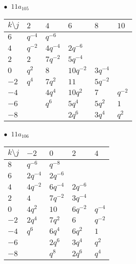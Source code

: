 \begin{minipage}{\linewidth}
$\bullet\ $ $11a_{105}$ \vspace{0.5em} \\
\begin{tabular}{l|lllll}
$k \setminus j$ & $2$ & $4$ & $6$ & $8$ & $10$ \\
\hline
$6$ & $q^{-4}$ & $q^{-6}$ &  &  &  \\
$4$ & $q^{-2}$ & $4q^{-4}$ & $2q^{-6}$ &  &  \\
$2$ & $2$ & $7q^{-2}$ & $5q^{-4}$ &  &  \\
$0$ & $q^{2}$ & $8$ & $10q^{-2}$ & $3q^{-4}$ &  \\
$-2$ & $q^{4}$ & $7q^{2}$ & $11$ & $5q^{-2}$ &  \\
$-4$ &  & $4q^{4}$ & $10q^{2}$ & $7$ & $q^{-2}$ \\
$-6$ &  & $q^{6}$ & $5q^{4}$ & $5q^{2}$ & $1$ \\
$-8$ &  &  & $2q^{6}$ & $3q^{4}$ & $q^{2}$ \\
\end{tabular}
\vspace{2em}
\end{minipage}
%
\begin{minipage}{\linewidth}
$\bullet\ $ $11a_{106}$ \vspace{0.5em} \\
\begin{tabular}{l|llll}
$k \setminus j$ & $-2$ & $0$ & $2$ & $4$ \\
\hline
$8$ & $q^{-6}$ & $q^{-8}$ &  &  \\
$6$ & $2q^{-4}$ & $2q^{-6}$ &  &  \\
$4$ & $4q^{-2}$ & $6q^{-4}$ & $2q^{-6}$ &  \\
$2$ & $4$ & $7q^{-2}$ & $3q^{-4}$ &  \\
$0$ & $4q^{2}$ & $10$ & $6q^{-2}$ & $q^{-4}$ \\
$-2$ & $2q^{4}$ & $7q^{2}$ & $6$ & $q^{-2}$ \\
$-4$ & $q^{6}$ & $6q^{4}$ & $6q^{2}$ & $1$ \\
$-6$ &  & $2q^{6}$ & $3q^{4}$ & $q^{2}$ \\
$-8$ &  & $q^{8}$ & $2q^{6}$ & $q^{4}$ \\
\end{tabular}
\vspace{2em}
\end{minipage}
%
